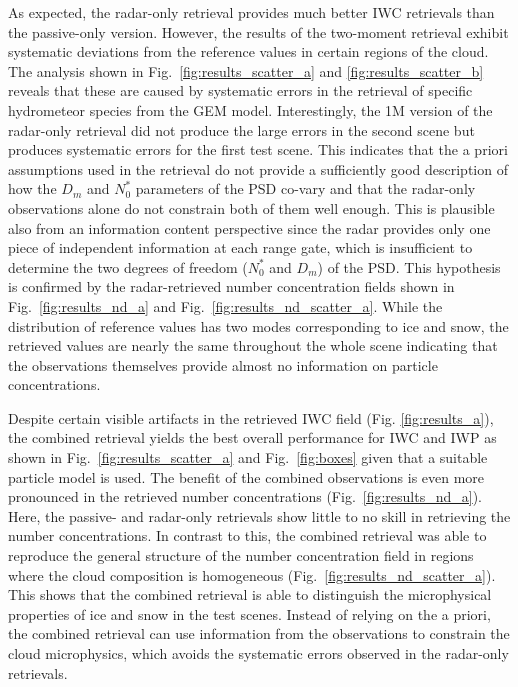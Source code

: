 \documentclass[journal abbreviation, manuscript]{copernicus}
\begin{document}
As expected, the radar-only retrieval provides much better IWC retrievals than
the passive-only version. However, the results of the two-moment retrieval
exhibit systematic deviations from the reference values in certain regions of
the cloud. The analysis shown in Fig.~\ref{fig:results_scatter_a} and
\ref{fig:results_scatter_b} reveals that these are caused by systematic errors
in the retrieval of specific hydrometeor species from the GEM model.
Interestingly, the 1M version of the radar-only retrieval did not produce the
large errors in the second scene but produces systematic errors for the first
test scene. This indicates that the a priori assumptions used in the retrieval
do not provide a sufficiently good description of how the $D_m$ and $N_0^*$
parameters of the PSD co-vary and that the radar-only observations alone do not
constrain both of them well enough. This is plausible also from an information
content perspective since the radar provides only one piece of independent
information at each range gate, which is insufficient to determine the two
degrees of freedom ($N_0^*$ and $D_m$) of the PSD. This hypothesis is confirmed
by the radar-retrieved number concentration fields shown in
Fig.~\ref{fig:results_nd_a} and Fig.~\ref{fig:results_nd_scatter_a}. While the
distribution of reference values has two modes corresponding to ice and snow,
the retrieved values are nearly the same throughout the whole scene indicating
that the observations themselves provide almost no information on particle
concentrations.

Despite certain visible artifacts in the retrieved IWC field (Fig.
\ref{fig:results_a}), the combined retrieval yields the best overall performance
for IWC and IWP as shown in Fig.~\ref{fig:results_scatter_a} and
Fig.~\ref{fig:boxes} given that a suitable particle model is used. The benefit
of the combined observations is even more pronounced in the retrieved number
concentrations (Fig.~\ref{fig:results_nd_a}). Here, the passive- and radar-only
retrievals show little to no skill in retrieving the number concentrations. In
contrast to this, the combined retrieval was able to reproduce the general
structure of the number concentration field in regions where the cloud
composition is homogeneous (Fig.~\ref{fig:results_nd_scatter_a}). This shows
that the combined retrieval is able to distinguish the microphysical properties
of ice and snow in the test scenes. Instead of relying on the a priori, the
combined retrieval can use information from the observations to constrain the
cloud microphysics, which avoids the systematic errors observed in the
radar-only retrievals.
\end{document}
